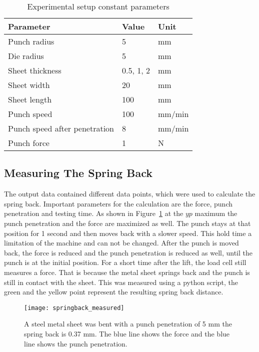 \begin{table}[H]
    \centering
    \begin{tabular}{|l|l|l|}
        \hline
        \textbf{Parameter}            & \textbf{Value} & \textbf{Unit} \\ \hline
        Punch radius                  & 5              & mm            \\
        Die radius                    & 5              & mm            \\
        Sheet thickness               & 0.5, 1, 2      & mm            \\
        Sheet width                   & 20             & mm            \\
        Sheet length                  & 100            & mm            \\
        Punch speed                   & 100            & mm/min        \\
        Punch speed after penetration & 8              & mm/min        \\
        Punch force                   & 1              & N             \\
        \hline
    \end{tabular}
    \caption{Experimental setup constant parameters}
    \label{tab:constant_parameters}
\end{table}


\subsection{Measuring The Spring Back}
The output data contained different data points, which were used to calculate the spring back.
Important parameters for the calculation are the force, punch penetration and testing time.
As shown in Figure~\ref{fig:springback_measured} at the $yp$ maximum the punch penetration and the force are maximized as well. The punch stays at that position for 1 second and then moves back with a slower speed. This hold time a limitation of the machine and can not be changed.
After the punch is moved back, the force is reduced and the punch penetration is reduced as well, until the punch is at the initial position. For a short time after the lift, the load  cell still measures a force. That is because the metal sheet springs back and the punch is still in contact with the sheet. This was measured using a python script, the green and the yellow point represent the resulting spring back distance.

\begin{figure}[H]
    \centering
    \texttt{[image: springback\_measured]}
    \caption{A steel metal sheet was bent with a punch penetration of 5 mm the spring back is 0.37 mm. The blue line shows the force and the blue line shows the punch penetration.}
    \label{fig:springback_measured}
\end{figure}

